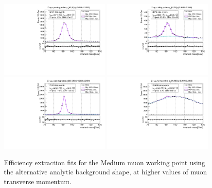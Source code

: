 \begin{figure}
\centering
\includegraphics[width=0.49\textwidth]{figures/Zmm_RecoTemplate_BkgAnalytic_pass_ptBin7_etaBin0.pdf}
\includegraphics[width=0.49\textwidth]{figures/Zmm_RecoTemplate_BkgAnalytic_fail_ptBin7_etaBin0.pdf}
\includegraphics[width=0.49\textwidth]{figures/Zmm_RecoTemplate_BkgAnalytic_pass_ptBin10_etaBin6.pdf}
\includegraphics[width=0.49\textwidth]{figures/Zmm_RecoTemplate_BkgAnalytic_fail_ptBin10_etaBin6.pdf}
\caption{Efficiency extraction fits for the Medium muon working point using the alternative analytic background shape, at higher values of muon transverse momentum.}
\label{fig:ZmmAltBkgFits2}
\end{figure}

